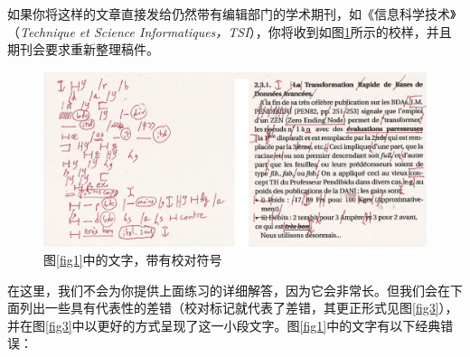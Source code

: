 如果你将这样的文章直接发给仍然带有编辑部门的学术期刊，如《信息科学技术》（\emph{Technique et Science Informatiques，TSI}），你将收到如图\ref{fig2}所示的校样，并且期刊会要求重新整理稿件。

\begin{figure}
    \centering
    \includegraphics[width = \linewidth]{img/2.png}
    \caption{图\ref{fig1}中的文字，带有校对符号}
    \label{fig2}
\end{figure}

在这里，我们不会为你提供上面练习的详细解答，因为它会非常长。但我们会在下面列出一些具有代表性的差错（校对标记就代表了差错，其更正形式见图\ref{fig3}），并在图\ref{fig3}中以更好的方式呈现了这一小段文字。图\ref{fig1}中的文字有以下经典错误：

